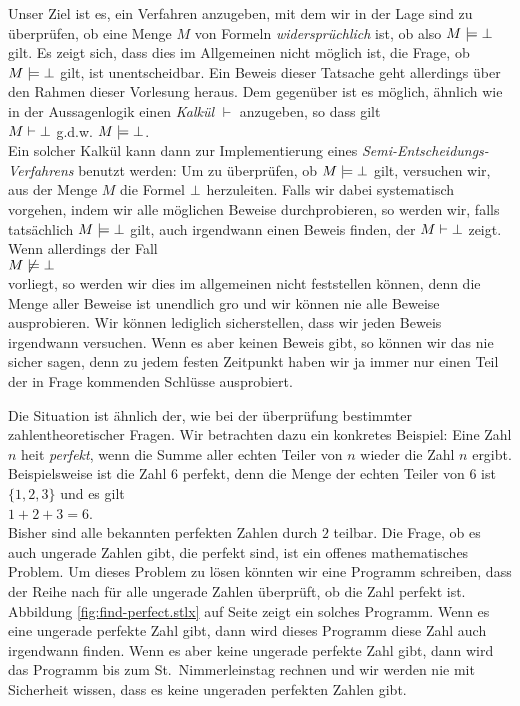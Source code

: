 \noindent
Unser Ziel ist es, ein Verfahren anzugeben, mit dem wir in der Lage sind zu \"{u}berpr\"{u}fen,
ob eine Menge $M$ von Formeln \emph{widerspr\"{u}chlich} ist, ob also 
 $M \models \bot$ gilt.  Es zeigt sich, dass dies im Allgemeinen nicht
m\"{o}glich ist, die Frage, ob $M \models \bot$ gilt, ist unentscheidbar.  Ein Beweis
dieser Tatsache geht allerdings \"{u}ber den Rahmen dieser Vorlesung heraus.
Dem gegen\"{u}ber ist es m\"{o}glich, \"{a}hnlich wie in der Aussagenlogik
einen \emph{Kalk\"{u}l} $\vdash$ anzugeben, so dass gilt \\[0.2cm]
\hspace*{1.3cm} $M \vdash \bot$ \quad g.d.w. \quad $M \models \bot$. \\[0.2cm]
Ein solcher Kalk\"{u}l kann dann zur Implementierung eines
\emph{Semi-Entscheidungs-Verfahrens} benutzt werden:  Um zu \"{u}berpr\"{u}fen, ob
$M \models \bot$ gilt, versuchen wir, aus der Menge $M$ die Formel $\bot$
herzuleiten.  
Falls wir dabei systematisch vorgehen, indem wir alle m\"{o}glichen Beweise durchprobieren,
so werden wir, falls tats\"{a}chlich $M \models \bot$ gilt, auch irgendwann einen Beweis
finden, der $M \vdash \bot$ zeigt.   Wenn allerdings der Fall \\[0.2cm]
\hspace*{1.3cm}  $M \not\models \bot$ \\[0.2cm]
vorliegt,  so werden wir dies im allgemeinen nicht feststellen k\"{o}nnen, denn die Menge aller Beweise ist unendlich gro\3
und wir k\"{o}nnen nie alle Beweise ausprobieren.  Wir k\"{o}nnen lediglich sicherstellen, dass
wir jeden Beweis irgendwann versuchen.  Wenn es aber keinen Beweis gibt, so k\"{o}nnen wir das
nie sicher sagen, denn zu jedem festen Zeitpunkt haben wir ja immer nur einen Teil der in
Frage kommenden Schl\"{u}sse ausprobiert.

Die Situation ist \"{a}hnlich der, wie bei der \"{u}berpr\"{u}fung bestimmter zahlentheoretischer
Fragen.  Wir betrachten dazu ein konkretes Beispiel: Eine Zahl $n$ hei\3t \emph{perfekt},
wenn die Summe aller echten Teiler von $n$ wieder die Zahl $n$ ergibt.  Beispielsweise ist
die Zahl $6$ perfekt, denn die Menge der echten Teiler von $6$ ist $\{1,2,3\}$ und es gilt
\\[0.2cm]
\hspace*{1.3cm}
$1 + 2 + 3 = 6$.
\\[0.2cm]
Bisher sind alle bekannten perfekten Zahlen durch $2$ teilbar.  Die Frage, ob es auch
ungerade Zahlen gibt, die perfekt sind, ist ein offenes mathematisches Problem.  Um dieses
Problem zu l\"{o}sen k\"{o}nnten wir eine Programm schreiben, dass der Reihe nach f\"{u}r alle
ungerade Zahlen \"{u}berpr\"{u}ft, ob die Zahl perfekt ist.  Abbildung \ref{fig:find-perfect.stlx}
auf Seite \pageref{fig:find-perfect.stlx} zeigt ein solches Programm.  Wenn es eine ungerade perfekte Zahl
gibt, dann wird dieses Programm diese Zahl auch irgendwann finden.  Wenn es aber keine
ungerade perfekte Zahl gibt, dann wird das Programm bis zum St.~Nimmerleinstag rechnen und
wir werden nie mit Sicherheit wissen, dass es keine ungeraden perfekten Zahlen gibt.

